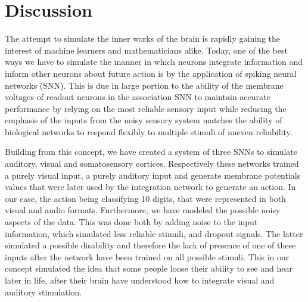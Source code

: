 \documentclass[conference]{IEEEtran}
\begin{document}







\section{Discussion}
The attempt to simulate the inner  works of the brain is  rapidly gaining the interest of machine learners and mathematicians alike. Today, one of the best ways we have to simulate the manner in which neurons integrate information and inform other neurons about future action is by the application of spiking neural networks (SNN). This is due in large portion to the ability of the membrane voltages of readout neurons in the association SNN to maintain accurate performance by relying on the most reliable sensory input while reducing the emphasis of the inputs from the noisy sensory system matches the ability of biological networks to respond flexibly to multiple stimuli of uneven reliability.

Building from this concept, we have created a system of three SNNs to simulate auditory, visual and somatosensory cortices. Respectively these networks trained a purely visual input, a purely auditory input and generate membrane potentials values that were later used by the integration network to generate an action. In our case, the action being classifying 10 digits, that were represented in both visual and audio formats.
Furthermore, we have modeled the possible noisy aspects of the data. This was done both by adding noise to the input information, which simulated less reliable stimuli, and dropout signals. The latter simulated a possible disability and therefore the lack of presence of one of these inputs after the network have been trained on all possible stimuli. This in our concept simulated the idea that some people loose their ability to see and hear  later in life, after their brain have understood how to integrate visual and auditory stimulation.
\end{document}

